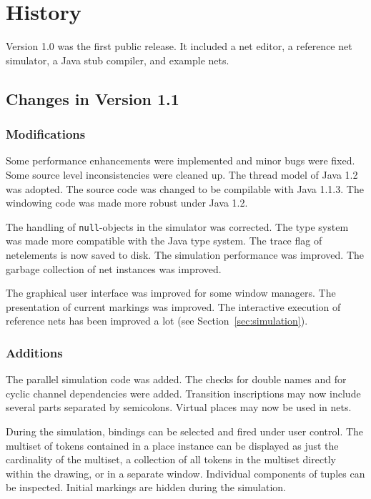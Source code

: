 \section{History}\label{sec:history}

Version 1.0 was the first public release. It
included a net editor, a reference net
simulator, a Java stub compiler, and example nets.

\subsection{Changes in Version 1.1}

\subsubsection*{Modifications}

Some performance enhancements were implemented and minor
bugs were fixed. Some source level inconsistencies were
cleaned up.
The thread model of Java 1.2 was adopted.
The source code was changed to be compilable with Java 1.1.3.
The windowing code was made more robust under Java 1.2.

The handling of \texttt{null}-objects in the simulator was corrected.
The type system was made more compatible with the Java type system.
The trace flag of netelements is now saved to disk.
The simulation performance was improved.
The garbage collection of net instances was improved.

The graphical user interface was improved for some window managers.
The presentation of current markings was improved.
The interactive execution of reference nets has been
improved a lot (see Section~\ref{sec:simulation}).

\subsubsection*{Additions}

The parallel simulation code was added.
The checks for double names and for cyclic channel
dependencies were added.
Transition inscriptions may now include several parts
separated by semicolons.
Virtual places may now be used in nets.

During the simulation, bindings can be selected and fired
under user control.
The multiset of tokens contained in
a place instance can be displayed as just the cardinality of the
multiset, a collection of all tokens in the multiset directly
within the drawing, or in a separate window.
Individual components of tuples can
be inspected. Initial markings are hidden during the simulation.

